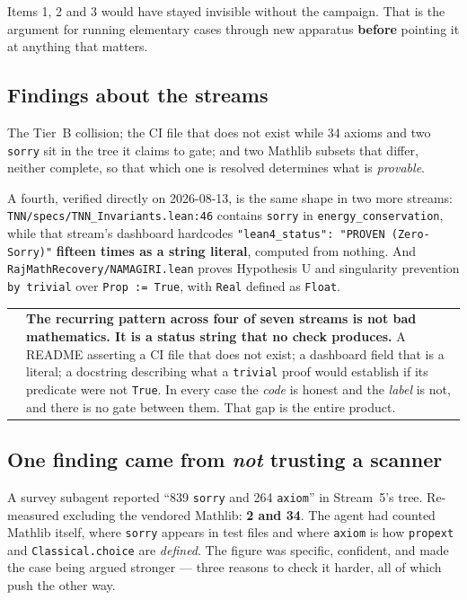 \documentclass[11pt,a4paper]{article}
\makeatletter
\newcommand{\caveat}[1]{%
  \par\vspace{0.6em}\noindent
  \begin{tabular}{@{}p{0.4em}@{\hspace{0.8em}}p{\dimexpr\linewidth-2.2em\relax}@{}}
  \textcolor{rulegray}{\rule{2pt}{\baselineskip}} & \small #1
  \end{tabular}\par\vspace{0.6em}}
\makeatother
\begin{document}
Items 1, 2 and 3 would have stayed invisible without the campaign. That is the argument for
running elementary cases through new apparatus \textbf{before} pointing it at anything that
matters.

\subsection{Findings about the streams}

The Tier~B collision; the CI file that does not exist while 34 axioms and two \texttt{sorry} sit
in the tree it claims to gate; and two Mathlib subsets that differ, neither complete, so that
which one is resolved determines what is \emph{provable}.

A fourth, verified directly on 2026-08-13, is the same shape in two more streams:
\texttt{TNN/specs/TNN_Invariants.lean:46} contains \texttt{sorry} in
\texttt{energy_conservation}, while that stream's dashboard hardcodes
\texttt{"lean4_status": "PROVEN (Zero-Sorry)"} \textbf{fifteen times as a string literal},
computed from nothing. And \texttt{RajMathRecovery/NAMAGIRI.lean} proves Hypothesis U and
singularity prevention \texttt{by trivial} over \texttt{Prop := True}, with \texttt{Real} defined
as \texttt{Float}.

\caveat{\textbf{The recurring pattern across four of seven streams is not bad mathematics. It is
a status string that no check produces.} A README asserting a CI file that does not exist; a
dashboard field that is a literal; a docstring describing what a \texttt{trivial} proof would
establish if its predicate were not \texttt{True}. In every case the \emph{code} is honest and
the \emph{label} is not, and there is no gate between them. That gap is the entire product.}

\subsection{One finding came from \emph{not} trusting a scanner}

A survey subagent reported ``839 \texttt{sorry} and 264 \texttt{axiom}'' in Stream~5's tree.
Re-measured excluding the vendored Mathlib: \textbf{2 and 34}. The agent had counted Mathlib
itself, where \texttt{sorry} appears in test files and where \texttt{axiom} is how
\texttt{propext} and \texttt{Classical.choice} are \emph{defined}. The figure was specific,
confident, and made the case being argued stronger — three reasons to check it harder, all of
which push the other way.
\end{document}
